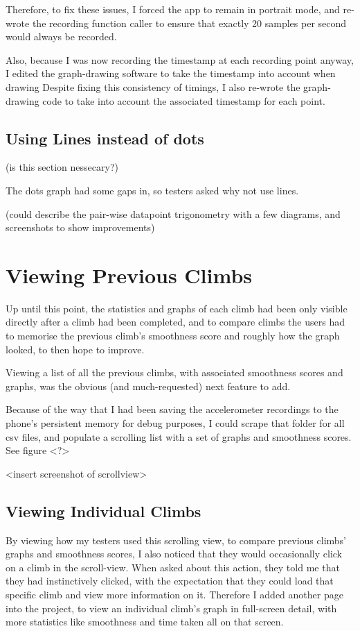 Therefore, to fix these issues, I forced the app to remain in portrait mode, and re-wrote the recording function caller to ensure that exactly 20 samples per second would always be recorded.

Also, because I was now recording the timestamp at each recording point anyway, I edited the graph-drawing software to take the timestamp into account when drawing
Despite fixing this consistency of timings, I also re-wrote the graph-drawing code to take into account the associated timestamp for each point.

\subsection{Using Lines instead of dots}

(is this section nessecary?)

The dots graph had some gaps in, so testers asked why not use lines.

(could describe the pair-wise datapoint trigonometry with a few diagrams, and screenshots to show improvements)


\section{Viewing Previous Climbs}
Up until this point, the statistics and graphs of each climb had been only visible directly after a climb had been completed, and to compare climbs the users had to memorise the previous climb's smoothness score and roughly how the graph looked, to then hope to improve.

Viewing a list of all the previous climbs, with associated smoothness scores and graphs, was the obvious (and much-requested) next feature to add.

Because of the way that I had been saving the accelerometer recordings to the phone's persistent memory for debug purposes, I could scrape that folder for all csv files, and populate a scrolling list with a set of graphs and smoothness scores.
See figure <?>

<insert screenshot of scrollview>

\subsection{Viewing Individual Climbs}
By viewing how my testers used this scrolling view, to compare previous climbs' graphs and smoothness scores, I also noticed that they would occasionally click on a climb in the scroll-view.
When asked about this action, they told me that they had instinctively clicked, with the expectation that they could load that specific climb and view more information on it.
Therefore I added another page into the project, to view an individual climb's graph in full-screen detail, with more statistics like smoothness and time taken all on that screen.

